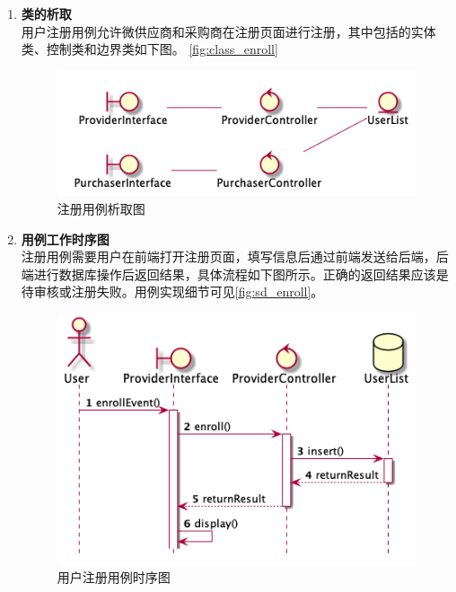 	\begin{enumerate}
		\item \textbf{类的析取} \\
		用户注册用例允许微供应商和采购商在注册页面进行注册，其中包括的实体类、控制类和边界类如下图。
		\autoref{fig:class_enroll}
		\begin{figure}[htp]
		    \centering
		    \includegraphics[width=12cm]{misc/figure_src/class_diagram/enroll.png}
		    \caption{注册用例析取图}
		    \label{fig:class_enroll}
		\end{figure}

		\item \textbf{用例工作时序图} \\
		注册用例需要用户在前端打开注册页面，填写信息后通过前端发送给后端，后端进行数据库操作后返回结果，具体流程如下图所示。正确的返回结果应该是待审核或注册失败。用例实现细节可见\autoref{fig:sd_enroll}。

		\begin{figure}[htp]
		    \centering
		    \includegraphics[width=12cm]{misc/figure_src/sequence_diagram/sd_enroll.png}
		    \caption{用户注册用例时序图}
		    \label{fig:sd_enroll}
		\end{figure}

	\end{enumerate}

